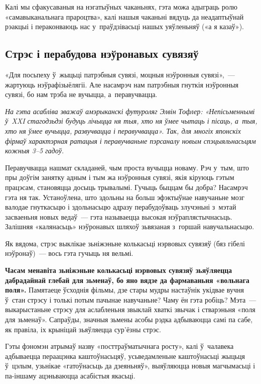 Калі мы сфакусаваныя на нэгатыўных чаканьнях, гэта можа адыграць ролю «самавыканальнага прароцтва», калі нашыя чаканьні вядуць да неадаптыўнай рэакцыі і пераконваюць нас у~праўдзівасьці нашых уяўленьняў («а я казаў»).

\subsection*{Стрэс і перабудова нэўронавых сувязяў}

«Для посьпеху ў~жыцьці патрэбныя сувязі, моцныя нэўронныя сувязі»,~--- жартуюць нэўрафізыёлягіі. Але насамрэч нам патрэбныя гнуткія нэўронныя сувязі, бо нам трэба не вучыцца, а~перавучвацца. 

\emph{На гэта асабліва зважаў амэрыканскі футуроляг Элвін Тофлер: «Непісьменнымі ў~XXI стагодзьдзі будуць лічыцца ня тыя, хто ня ўмее чытаць і пісаць, а~тыя, хто ня ўмее вучыцца, развучвацца і перавучвацца». Так, для многіх японскіх фірмаў характэрная ратацыя і перавучваньне пэрсаналу новым спэцыяльнасьцям кожныя 3--5 гадоў.}

Перавучвацца нашмат складаней, чым проста вучыцца новаму. Рэч у~тым, што пры доўгім занятку адным і тым жа нэўронныя сувязі, якія кіруюць гэтым працэсам, становяцца досыць трывалымі. Гучыць быццам бы добра? Насамрэч гэта ня так. Устаноўлена, што здольны на больш эфэктыўнае навучаньне мозг валодае гнуткасьцю і здольнасьцю адразу перабудоўваць злучэньні з~мэтай засваеньня новых ведаў~--- гэта называецца высокая нэўраплястычнасьць. Залішняя «калянасьць» нэўронавых шляхоў зьвязаная з~горшай навучальнасьцю.

Як вядома, стрэс выклікае зьніжэньне колькасьці нэрвовых сувязяў (бяз гібелі нэўронаў)~--- вось гэта гучыць ня вельмі.

\textbf{Часам менавіта зьніжэньне колькасьці нэрвовых сувязяў зьяўляецца дабрадайнай глебай для зьменаў, бо яно вядзе да фармаваньня «вольнага поля».} Памятаеце ўсходнія фільмы, дзе стары мудры настаўнік укідвае вучня ў~стан стрэсу і толькі потым пачынае навучаньне? Чаму ён гэта робіць? Мэта~--- выкарыстаньне стрэсу для аслабленьня звыклай хваткі звычак і стварэньня «поля для зьменаў». Сапраўды, значныя зьмены асобы рэдка адбываюцца самі па сабе, як правіла, іх крыніцай зьяўляецца сур'ёзны стрэс.

Гэты фэномэн атрымаў назву «посттраўматычнага росту», калі ў~чалавека адбываецца пераацэнка каштоўнасьцяў, усьведамленьне каштоўнасьці жыцьця ў~цэлым, узьнікае «гатоўнасьць да дзеяньняў», выяўляюцца новыя магчымасьці і па-іншаму ацэньваюцца асабістыя якасьці. 

